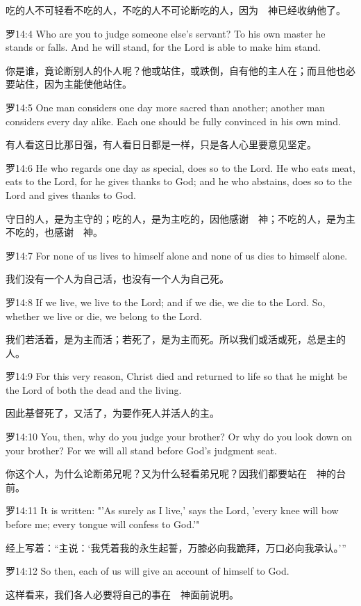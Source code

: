 \documentclass[a4paper,11pt,onecolumn,twoside]{ctexart}
\begin{document}
\begin{multicols}{2}
 吃的人不可轻看不吃的人，不吃的人不可论断吃的人，因为　神已经收纳他了。


 罗14:4
 Who are you to judge someone else's servant? To his own master he stands or falls. And he will stand, for the Lord is able to make him stand.

 你是谁，竟论断别人的仆人呢？他或站住，或跌倒，自有他的主人在；而且他也必要站住，因为主能使他站住。


 罗14:5
 One man considers one day more sacred than another; another man considers every day alike. Each one should be fully convinced in his own mind.

 有人看这日比那日强，有人看日日都是一样，只是各人心里要意见坚定。


 罗14:6
 He who regards one day as special, does so to the Lord. He who eats meat, eats to the Lord, for he gives thanks to God; and he who abstains, does so to the Lord and gives thanks to God.

 守日的人，是为主守的；吃的人，是为主吃的，因他感谢　神；不吃的人，是为主不吃的，也感谢　神。


 罗14:7
 For none of us lives to himself alone and none of us dies to himself alone.

 我们没有一个人为自己活，也没有一个人为自己死。


 罗14:8
 If we live, we live to the Lord; and if we die, we die to the Lord. So, whether we live or die, we belong to the Lord.

 我们若活着，是为主而活；若死了，是为主而死。所以我们或活或死，总是主的人。


 罗14:9
 For this very reason, Christ died and returned to life so that he might be the Lord of both the dead and the living.

 因此基督死了，又活了，为要作死人并活人的主。


 罗14:10
 You, then, why do you judge your brother? Or why do you look down on your brother? For we will all stand before God's judgment seat.

 你这个人，为什么论断弟兄呢？又为什么轻看弟兄呢？因我们都要站在　神的台前。


 罗14:11
 It is written: "'As surely as I live,' says the Lord, 'every knee will bow before me; every tongue will confess to God.'"

 经上写着：“主说：‘我凭着我的永生起誓，万膝必向我跪拜，万口必向我承认。’”


 罗14:12
 So then, each of us will give an account of himself to God.

 这样看来，我们各人必要将自己的事在　神面前说明。



\end{multicols}
\end{document}
